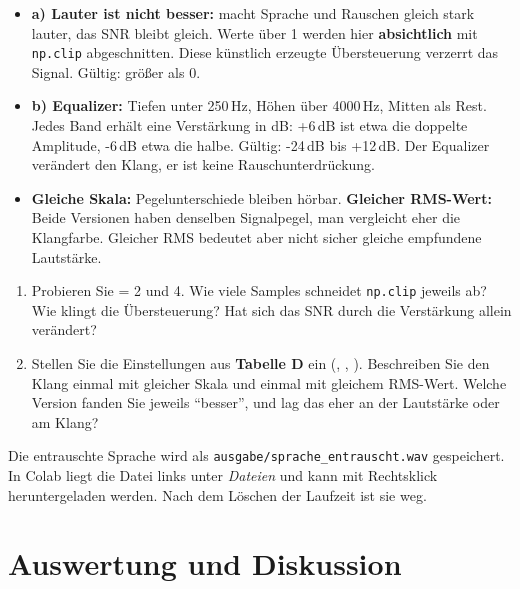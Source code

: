 \documentclass[11pt]{article}
\begin{document}
\begin{itemize}
  \item \textbf{a) Lauter ist nicht besser:}  macht Sprache und Rauschen gleich stark lauter, das SNR bleibt gleich. Werte über 1 werden hier \textbf{absichtlich} mit \texttt{np.clip} abgeschnitten. Diese künstlich erzeugte Übersteuerung verzerrt das Signal. Gültig:  größer als 0.
  \item \textbf{b) Equalizer:} Tiefen unter 250\,Hz, Höhen über 4000\,Hz, Mitten als Rest. Jedes Band erhält eine Verstärkung in dB: +6\,dB ist etwa die doppelte Amplitude, -6\,dB etwa die halbe. Gültig: -24\,dB bis +12\,dB. Der Equalizer verändert den Klang, er ist keine Rauschunterdrückung.
  \item \textbf{Gleiche Skala:} Pegelunterschiede bleiben hörbar. \textbf{Gleicher RMS-Wert:} Beide Versionen haben denselben Signalpegel, man vergleicht eher die Klangfarbe. Gleicher RMS bedeutet aber nicht sicher gleiche empfundene Lautstärke.
\end{itemize}

\begin{block}
\begin{enumerate}
  \item Probieren Sie  = 2 und 4. Wie viele Samples schneidet \texttt{np.clip} jeweils ab? Wie klingt die Übersteuerung? Hat sich das SNR durch die Verstärkung allein verändert?
  \item Stellen Sie die Einstellungen aus \textbf{Tabelle D} ein (, , ). Beschreiben Sie den Klang einmal mit gleicher Skala und einmal mit gleichem RMS-Wert. Welche Version fanden Sie jeweils "`besser"', und lag das eher an der Lautstärke oder am Klang?
\end{enumerate}
\end{block}

\begin{block}
Die entrauschte Sprache wird als \texttt{ausgabe/sprache\_entrauscht.wav} gespeichert. In Colab liegt die Datei links unter \textit{Dateien} und kann mit Rechtsklick heruntergeladen werden. Nach dem Löschen der Laufzeit ist sie weg.
\end{block}

\clearpage
\section{Auswertung und Diskussion}
\end{document}
